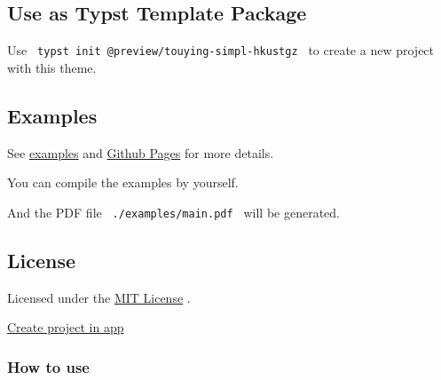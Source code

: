 \subsection{Use as Typst Template
Package}\label{use-as-typst-template-package}

Use \texttt{\ typst\ init\ @preview/touying-simpl-hkustgz\ } to create a
new project with this theme.

\begin{Shaded}
\begin{Highlighting}[]
\end{Highlighting}
\end{Shaded}

\subsection{Examples}\label{examples}

See
\href{https://github.com/typst/packages/raw/main/packages/preview/touying-simpl-hkustgz/0.1.1/examples}{examples}
and \href{https://exaclior.github.io/touying-simpl-hkustgz}{Github
Pages} for more details.

You can compile the examples by yourself.

\begin{Shaded}
\begin{Highlighting}[]
\end{Highlighting}
\end{Shaded}

And the PDF file \texttt{\ ./examples/main.pdf\ } will be generated.

\subsection{License}\label{license}

Licensed under the
\href{https://github.com/typst/packages/raw/main/packages/preview/touying-simpl-hkustgz/0.1.1/LICENSE}{MIT
License} .

\href{/app?template=touying-simpl-hkustgz&version=0.1.1}{Create project
in app}

\subsubsection{How to use}\label{how-to-use}

